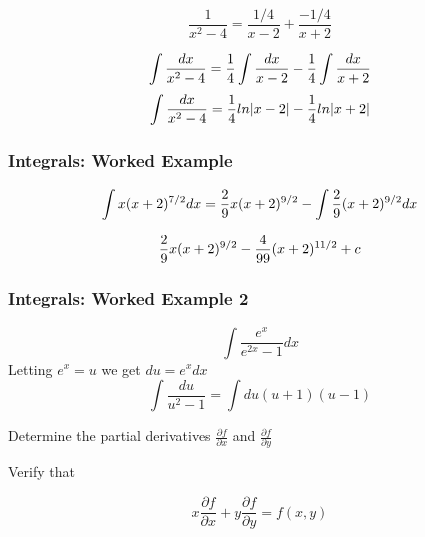 \documentclass{beamer}
\begin{document}
			\begin{frame}
		\[ \frac{1}{x^2-4} = \frac{1/4}{x-2} + \frac{-1/4}{x+2} \]
		
		\[ \int \frac{dx}{x^2-4} = {1 \over 4}\int \frac{dx}{x-2} -{1 \over 4}\int \frac{dx}{x+2} \]
		\[ \int \frac{dx}{x^2-4} = {1 \over 4}ln|x-2|-{1 \over 4}ln|x+2| \]
		
		
			\end{frame}
			\begin{frame}
		\frametitle{Integrals: Worked Example}
		
		\[ \int x(x+2)^{7/2}dx = {2 \over 9}x(x+2)^{9/2} - \int {2 \over 9}(x+2)^{9/2}dx\]
		
		\[ {2 \over 9 }x (x+2)^{9/2} -  {4 \over 99}(x+2)^{11/2} + c \]
		
		\end{frame}
		\begin{frame}
		\frametitle{Integrals: Worked Example 2}
		\[ \int \frac{e^x}{e^{2x}-1}dx  \]
		Letting $e^x=u$ we get $du=e^x dx$
		\[ \int \frac{du}{u^2-1} = \int {du}{(u+1)(u-1)}\]
		
			\end{frame}
			\begin{frame}
		
		
		Determine the partial derivatives $\frac{\partial f}{\partial x } $
		and $\frac{\partial f}{\partial y } $
			\end{frame}
			\begin{frame}
		
		Verify that
		
		\[x\frac{\partial f}{\partial x } +  y\frac{\partial f}{\partial y }= f(x,y)\]
		
		
		
		
			\end{frame}
\end{document}
